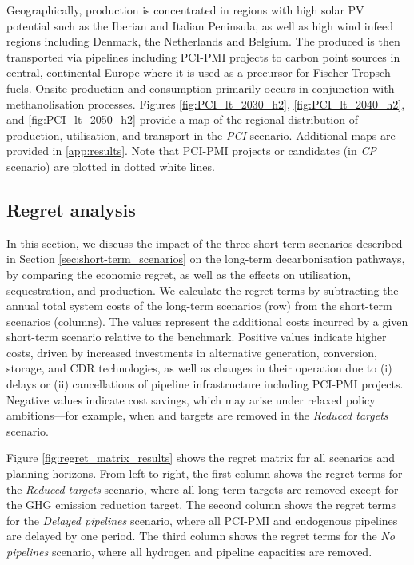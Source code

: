 \documentclass[final,5p,times,twocolumn,sort&compress]{elsarticle}
\begin{document}
Geographically,  production is concentrated in regions with high solar PV potential such as the Iberian and Italian Peninsula, as well as high wind infeed regions including Denmark, the Netherlands and Belgium. The produced  is then transported via  pipelines including PCI-PMI projects to carbon point sources  in central, continental Europe where it is used as a precursor for Fischer-Tropsch fuels. Onsite  production and consumption primarily occurs in conjunction with methanolisation processes. Figures \ref{fig:PCI_lt_2030_h2}, \ref{fig:PCI_lt_2040_h2}, and \ref{fig:PCI_lt_2050_h2} provide a map of the regional distribution of  production, utilisation, and transport in the \textit{PCI} scenario. Additional maps are provided in \ref{app:results}. Note that PCI-PMI projects or candidates (in \textit{CP} scenario) are plotted in dotted white lines.


\subsection{Regret analysis}
\label{sec:regret-analysis}

In this section, we discuss the impact of the three short-term scenarios described in Section \ref{sec:short-term_scenarios} on the long-term decarbonisation pathways, by comparing the economic regret, as well as the effects on  utilisation, sequestration, and  production.
We calculate the regret terms by subtracting the annual total system costs of the long-term scenarios (row) from the short-term scenarios (columns). 
The values represent the additional costs incurred by a given short-term scenario relative to the benchmark. Positive values indicate higher costs, driven by increased investments in alternative generation, conversion, storage, and CDR technologies, as well as changes in their operation due to (i) delays or (ii) cancellations of pipeline infrastructure including PCI-PMI projects. Negative values indicate cost savings, which may arise under relaxed policy ambitions—for example, when  and  targets are removed in the \textit{Reduced targets} scenario.

Figure \ref{fig:regret_matrix_results} shows the regret matrix for all scenarios and planning horizons. From left to right, the first column shows the regret terms for the \textit{Reduced targets} scenario, where all long-term targets are removed except for the GHG emission reduction target. The second column shows the regret terms for the \textit{Delayed pipelines} scenario, where all PCI-PMI and endogenous pipelines are delayed by one period. The third column shows the regret terms for the \textit{No pipelines} scenario, where all hydrogen and  pipeline capacities are removed.
\end{document}
